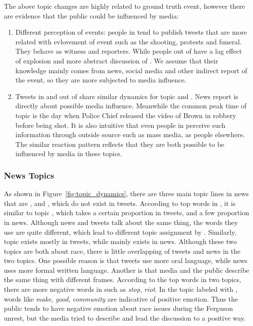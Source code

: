 The above topic changes are highly related to ground truth event, however there are evidence that the public could be influenced by media:
\begin{enumerate}
\item Different perception of events: people in \stlouis tend to publish tweets that are more related with evlovement of event such as the shooting, protests and funeral. They behave as witness and reporters. While people out of \stlouis have a lag effect of \emotion explosion and more abstract discussion of \racism. We assume that their knowledge mainly comes from news, social media and other indirect report of the event, so they are more subjected to media influence.
\item Tweets in and out of \stlouis share similar dynamics for topic \newsreport and \michaelbrown. News report is directly about possible media influence. Meanwhile the common peak time of topic \michaelbrown is the day when Police Chief released the video of Brown in robbery before being shot. It is also intuitive that even people in \stlouis perceive such information through outside source such as mass media, as people elsewhere. The similar reaction pattern reflects that they are both possible to be influenced by media in these topics.
\end{enumerate}

\subsubsection{News Topics}
As shown in Figure~\ref{fig:topic_dynamics}, there are three main topic lines in news that are \obamatalk, \shootincident and \raceandcommunity, which do not exist in tweets. According to top words in \shootincident, it is similar to topic \michaelbrown, which takes a certain proportion in tweets, and a few proportion in news. Although news and tweets talk about the same thing, the words they use are quite different, which lead to different topic assignment by \stlda. Similarly, \racism topic exists mostly in tweets, while \raceandcommunity mainly exists in news. Although these two topics are both about race, there is little overlapping of tweets and news in the two topics. One possible reason is that tweets use more oral language, while news uses more formal written language. Another is that media and the public describe the same thing with different frames. According to the top words in two topics, there are more negative words in \racism such as \emph{stop}, \emph{riot}. In the topic labeled with \raceandcommunity, words like \emph{make}, \emph{good}, \emph{community} are indicative of positive emotion. Thus the public tends to have negative emotion about race issues during the Ferguson unrest, but the media tried to describe and lead the discussion to a positive way.

